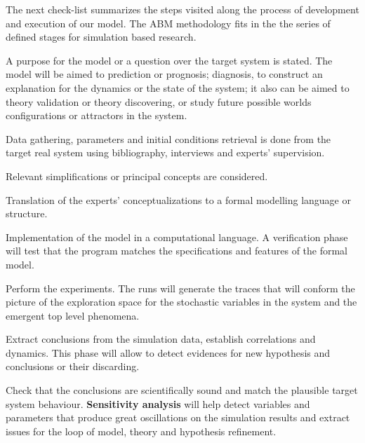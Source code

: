 \documentclass[11pt,oneside,a4paper,openright]{report}
\begin{document}
The next check-list summarizes the steps visited along the process of development and execution of our model. The ABM methodology fits in the the series of defined stages for simulation based research. 

\begin{description}
\renewcommand{\labelitemi}{$\bullet$}
\renewcommand{\labelitemii}{$\cdot$}
\item [Definition of the target] A purpose for the model or a question over the target system is stated. The model will be aimed to prediction or prognosis; diagnosis, to construct an explanation for the dynamics or the state of the system; it also can be aimed to theory validation or theory discovering, or study future possible worlds configurations or attractors in the system.
\item [Observations] Data gathering, parameters and initial conditions retrieval is done from the target real system using bibliography, interviews and experts' supervision.
\item [Assumptions] Relevant simplifications or principal concepts are considered. 
\item [Design model] Translation of the experts' conceptualizations to a formal modelling language or structure. 
\item [Computer programming] Implementation of the model in a computational language. A verification phase will test that the program matches the specifications and features of the formal model.
\item [Run simulation] Perform the experiments. The runs will generate the traces that will conform the picture of the exploration space for the stochastic variables in the system and the emergent top level phenomena.
\item [Gather results] Extract conclusions from the simulation data, establish correlations and dynamics. This phase will allow to detect evidences for new hypothesis and conclusions or their discarding.  
\item [Validation] Check that the conclusions are scientifically sound and match the plausible target system behaviour. \textbf{Sensitivity analysis} will help detect variables and parameters that produce great oscillations on the simulation results and extract issues for the loop of model, theory and hypothesis refinement.
\end{description}


\end{document}
